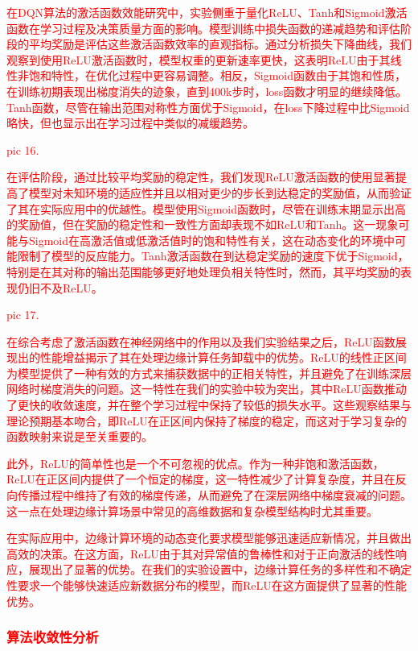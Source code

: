 \documentclass[preprint,12pt]{elsarticle}
\begin{document}
\textcolor{red}{在DQN算法的激活函数效能研究中，实验侧重于量化ReLU、Tanh和Sigmoid激活函数在学习过程及决策质量方面的影响。模型训练中损失函数的递减趋势和评估阶段的平均奖励是评估这些激活函数效率的直观指标。通过分析损失下降曲线，我们观察到使用ReLU激活函数时，模型权重的更新速率更快，这表明ReLU由于其线性非饱和特性，在优化过程中更容易调整。相反，Sigmoid函数由于其饱和性质，在训练初期表现出梯度消失的迹象，直到400k步时，loss函数才明显的继续降低。Tanh函数，尽管在输出范围对称性方面优于Sigmoid，在loss下降过程中比Sigmoid略快，但也显示出在学习过程中类似的减缓趋势。}

\textcolor{red}{pic 16.}

\textcolor{red}{在评估阶段，通过比较平均奖励的稳定性，我们发现ReLU激活函数的使用显著提高了模型对未知环境的适应性并且以相对更少的步长到达稳定的奖励值，从而验证了其在实际应用中的优越性。模型使用Sigmoid函数时，尽管在训练末期显示出高的奖励值，但在奖励的稳定性和一致性方面却表现不如ReLU和Tanh。这一现象可能与Sigmoid在高激活值或低激活值时的饱和特性有关，这在动态变化的环境中可能限制了模型的反应能力。Tanh激活函数在到达稳定奖励的速度下优于Sigmoid，特别是在其对称的输出范围能够更好地处理负相关特性时，然而，其平均奖励的表现仍旧不及ReLU。}

\textcolor{red}{pic 17.}

\textcolor{red}{在综合考虑了激活函数在神经网络中的作用以及我们实验结果之后，ReLU函数展现出的性能增益揭示了其在处理边缘计算任务卸载中的优势。ReLU的线性正区间为模型提供了一种有效的方式来捕获数据中的正相关特性，并且避免了在训练深层网络时梯度消失的问题。这一特性在我们的实验中较为突出，其中ReLU函数推动了更快的收敛速度，并在整个学习过程中保持了较低的损失水平。这些观察结果与理论预期基本吻合，即ReLU在正区间内保持了梯度的稳定，而这对于学习复杂的函数映射来说是至关重要的。}

\textcolor{red}{此外，ReLU的简单性也是一个不可忽视的优点。作为一种非饱和激活函数，ReLU在正区间内提供了一个恒定的梯度，这一特性减少了计算复杂度，并且在反向传播过程中维持了有效的梯度传递，从而避免了在深层网络中梯度衰减的问题。这一点在处理边缘计算场景中常见的高维数据和复杂模型结构时尤其重要。}

\textcolor{red}{在实际应用中，边缘计算环境的动态变化要求模型能够迅速适应新情况，并且做出高效的决策。在这方面，ReLU由于其对异常值的鲁棒性和对于正向激活的线性响应，展现出了显著的优势。在我们的实验设置中，边缘计算任务的多样性和不确定性要求一个能够快速适应新数据分布的模型，而ReLU在这方面提供了显著的性能优势。}

\textcolor{red}{\subsubsection{算法收敛性分析}}
\end{document}
